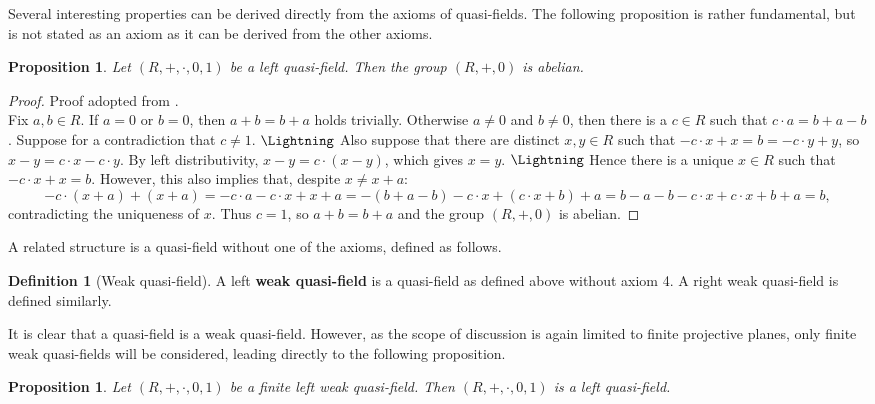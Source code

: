 \documentclass{report}
\newtheorem{proposition}[theorem]{Proposition}
\theoremstyle{definition}\newtheorem*{definition}{Definition}
\theoremstyle{definition}\newtheorem*{example}{Example}
\theoremstyle{remark}\newtheorem*{remark}{Remark}
\begin{document}
Several interesting properties can be derived directly from the axioms of quasi-fields. The following proposition is rather fundamental, but is not stated as an axiom as it can be derived from the other axioms.

\begin{proposition}
\label{prop:quasiabelian}
Let $ (R, +, \cdot, 0, 1) $ be a left quasi-field. Then the group $ (R, +, 0) $ is abelian.
\end{proposition}

\begin{proof}
Proof adopted from \cite{abelian}. \\
Fix $ a, b \in R $. If $ a = 0 $ or $ b = 0 $, then $ a + b = b + a $ holds trivially. Otherwise $ a \ne 0 $ and $ b \ne 0 $, then there is a $ c \in R $ such that $ c \cdot a = b + a - b $. Suppose for a contradiction that $ c \ne 1 $. $ \text{\Lightning} $ Also suppose that there are distinct $ x, y \in R $ such that $ - c \cdot x + x = b = - c \cdot y + y $, so $ x - y = c \cdot x - c \cdot y $. By left distributivity, $ x - y = c \cdot (x - y) $, which gives $ x = y $. $ \text{\Lightning} $ Hence there is a unique $ x \in R $ such that $ - c \cdot x + x = b $. However, this also implies that, despite $ x \ne x + a $: $$ -c \cdot (x + a) + (x + a) = -c \cdot a - c \cdot x + x + a = -(b + a - b) - c \cdot x + (c \cdot x + b) + a = b - a - b - c \cdot x + c \cdot x + b + a = b, $$ contradicting the uniqueness of $ x $. Thus $ c = 1 $, so $ a + b = b + a $ and the group $ (R, +, 0) $ is abelian.
\end{proof}

A related structure is a quasi-field without one of the axioms, defined as follows.

\begin{definition}[Weak quasi-field]
A left \textbf{weak quasi-field} is a quasi-field as defined above without axiom 4. A right weak quasi-field is defined similarly.
\end{definition}

It is clear that a quasi-field is a weak quasi-field. However, as the scope of discussion is again limited to finite projective planes, only finite weak quasi-fields will be considered, leading directly to the following proposition.

\begin{proposition}
\label{prop:weakquasi}
Let $ (R, +, \cdot, 0, 1) $ be a finite left weak quasi-field. Then $ (R, +, \cdot, 0, 1) $ is a left quasi-field.
\end{proposition}
\end{document}
